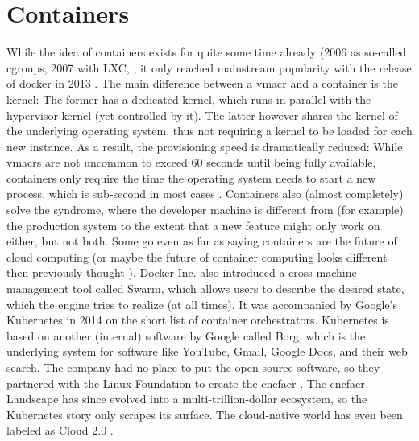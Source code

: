 

\section{Containers}
While the idea of containers exists for quite some time already (2006 as so-called cgroups, 2007 with LXC, \cite{cgroups} \cite{lxc}, it only reached mainstream popularity with the release of docker in 2013 \cite{docker_initial_release}. The main difference between a \gls{vmacr} and a container is the kernel: The former has a dedicated kernel, which runs in parallel with the hypervisor kernel (yet controlled by it). The latter however shares the kernel of the underlying operating system, thus not requiring a kernel to be loaded for each new instance. As a result, the provisioning speed is dramatically reduced: While \gls{vmacr}s are not uncommon to exceed 60 seconds until being fully available, containers only require the time the operating system needs to start a new process, which is sub-second in most cases \cite{vps_provisioning_times}.
\newline
Containers also (almost completely) solve the  syndrome, where the developer machine is different from (for example) the production system to the extent that a new feature might only work on either, but not both.
\newline
Some go even as far as saying containers are the future of cloud computing \cite{containers_future_cloud_computing} \cite{devopsonline_serverless_future} \cite{alibabacloud_serverless_future} \cite{ttpsc_serverless_future} (or maybe the future of container computing looks different then previously thought \cite{azure_modular_datacenter} \cite{google_patent_container}).
\newline
Docker Inc. also introduced a cross-machine management tool called Swarm, which allows users to describe the desired state, which the engine tries to realize (at all times). It was accompanied by Google's Kubernetes in 2014 on the short list of container orchestrators. Kubernetes is based on another (internal) software by Google called Borg, which is the underlying system for software like YouTube, Gmail, Google Docs, and their web search. The company had no place to put the open-source software, so they partnered with the Linux Foundation to create the \gls{cncfacr} \cite{cncf_guide_landscape}. The \gls{cncfacr} Landscape has since evolved into a multi-trillion-dollar ecosystem, so the Kubernetes story only scrapes its surface. The cloud-native world has even been labeled as Cloud 2.0 \cite{alibabacloud_serverless_future}.
